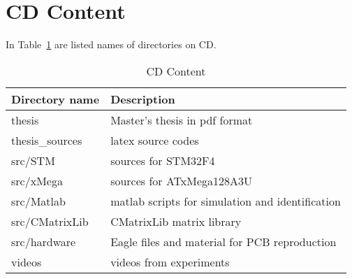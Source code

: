 \section{CD Content}

In Table~\ref{tab:obsah} are listed names of directories on CD.

\vspace{1cm}
\begin{table}[!htb]
\centering
\begin{tabular}{lp{10cm}}
\hline
\textbf{Directory name} & \textbf{Description} \\
\hline
thesis & Master's thesis in pdf format\\
thesis\_sources & latex source codes \\
src/STM & sources for STM32F4 \\
src/xMega & sources for ATxMega128A3U \\
src/Matlab & matlab scripts for simulation and identification \\
src/CMatrixLib & CMatrixLib matrix library \\
src/hardware & Eagle files and material for PCB reproduction\\
videos & videos from experiments \\
\hline
\end{tabular}
\caption{CD Content}
\label{tab:obsah}
\end{table}